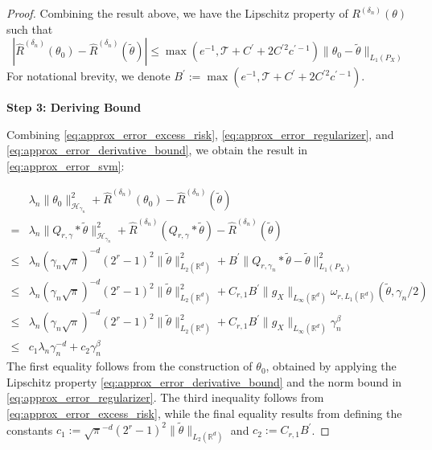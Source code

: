 \documentclass[12pt]{article}
\begin{document}
\begin{proof}
Combining the result above, we have the Lipschitz property of $R^{({\delta_n})}(\theta)$ such that
\begin{equation}\label{eq:approx_error_derivative_bound}
    \left|\widehat R^{({\delta_n})}(\theta_0) -\widehat R^{({\delta_n})}(\tilde\theta)\right|\leq \max(e^{-1},\mathcal{T}+C^\prime + 2C^{\prime2}c^{\prime-1})\|\theta_0 -\tilde\theta \|_{L_1(P_X)}
\end{equation}
For notational brevity, we denote $B^\prime:=\max(e^{-1},\mathcal{T}+C^\prime + 2C^{\prime2}c^{\prime-1})$.

\noindent \textbf{Step 3: Deriving Bound}

\noindent Combining \eqref{eq:approx_error_excess_risk}, \eqref{eq:approx_error_regularizer}, and \eqref{eq:approx_error_derivative_bound}, we obtain the result in \eqref{eq:approx_error_svm}:
 


\begin{align}
&\lambda_n\|\theta_0\|^2_{\mathcal{H}_{\gamma_n}}+\widehat R^{({\delta_n})}(\theta_0) -\widehat R^{({\delta_n})}(\tilde\theta)\nonumber\\
    =& \lambda_n \|Q_{r,\gamma} * \tilde\theta\|^2_{\mathcal{H}_{\gamma_n}} + \widehat R^{({\delta_n})}(Q_{r,\gamma} * \tilde\theta) -\widehat R^{({\delta_n})}(\tilde\theta)\nonumber\\
    \le{}& \lambda_n (\gamma_n\sqrt{\pi})^{-d}(2^r - 1)^2 \|\tilde\theta\|_{L_2(\mathbb{R}^d)}^2 +  B^\prime\|Q_{r,\gamma_n} * \tilde\theta - \tilde\theta\|_{L_1(P_X)}^2 \nonumber\\
    \le{}& \lambda_n (\gamma_n\sqrt{\pi})^{-d}(2^r - 1)^2 \|\tilde\theta\|_{L_2(\mathbb{R}^d)}^2 +  C_{r,1} B^\prime\|g_X\|_{L_\infty(\mathbb{R}^d)} \omega_{r,L_{1}(\mathbb{R}^d)}(\tilde\theta, \gamma_n/2)\nonumber\\
    \le{} & \lambda_n (\gamma_n\sqrt{\pi})^{-d}(2^r - 1)^2 \|\tilde\theta\|_{L_2(\mathbb{R}^d)}^2 +  C_{r,1} B^\prime\|g_X\|_{L_\infty(\mathbb{R}^d)} \gamma_n^\beta\nonumber\\
    \leq & c_1 \lambda_n\gamma_n^{-d} + c_2\gamma_n^{\beta}
\end{align} 
The first equality follows from the construction of $\theta_0$, obtained by applying the Lipschitz property \eqref{eq:approx_error_derivative_bound} and the norm bound in \eqref{eq:approx_error_regularizer}. The third inequality follows from \eqref{eq:approx_error_excess_risk}, while the final equality results from defining the constants $c_1 := \sqrt{\pi}^{-d}(2^r - 1)^2 \|\tilde\theta\|_{L_2(\mathbb{R}^d)}$ and $c_2 := C_{r,1} B^\prime$.



\end{proof}
\end{document}
